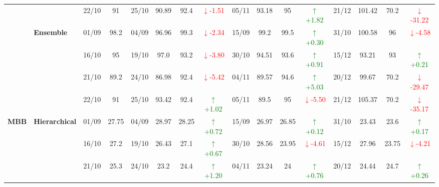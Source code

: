 \documentclass{ieeeaccess}
\begin{document}
{\begin{longtable}{llcc|cccc|cccc|cccc}
&
& 22/10 & 91 & 25/10 & 90.89 & 92.4 & \textcolor{red}{\(\downarrow\)-1.51} & 05/11 & 93.18 & 95 & \textcolor{green}{\(\uparrow\)+1.82} & 21/12 & 101.42 & 70.2 & \textcolor{red}{\(\downarrow\)-31.22} \\
\cmidrule(lr){2-16}


& \textbf{Ensemble}
& 01/09 & 98.2 & 04/09 & 96.96 & 99.3 & \textcolor{red}{\(\downarrow\)-2.34} & 15/09 & 99.2 & 99.5 & \textcolor{green}{\(\uparrow\)+0.30} & 31/10 & 100.58 & 96 & \textcolor{red}{\(\downarrow\)-4.58} \\

&
& 16/10 & 95 & 19/10 & 97.0 & 93.2 & \textcolor{red}{\(\downarrow\)-3.80} & 30/10 & 94.51 & 93.6 & \textcolor{green}{\(\uparrow\)+0.91} & 15/12 & 93.21 & 93 & \textcolor{green}{\(\uparrow\)+0.21} \\

&
& 21/10 & 89.2 & 24/10 & 86.98 & 92.4 & \textcolor{red}{\(\downarrow\)-5.42} & 04/11 & 89.57 & 94.6 & \textcolor{green}{\(\uparrow\)+5.03} & 20/12 & 99.67 & 70.2 & \textcolor{red}{\(\downarrow\)-29.47} \\

&
& 22/10 & 91 & 25/10 & 93.42 & 92.4 & \textcolor{green}{\(\uparrow\)+1.02} & 05/11 & 89.5 & 95 & \textcolor{red}{\(\downarrow\)-5.50} & 21/12 & 105.37 & 70.2 & \textcolor{red}{\(\downarrow\)-35.17} \\
\midrule



\multirow{12}{*}{\textbf{MBB}} 
& \textbf{Hierarchical}
& 01/09 & 27.75 & 04/09 & 28.97 & 28.25 & \textcolor{green}{\(\uparrow\)+0.72} & 15/09 & 26.97 & 26.85 & \textcolor{green}{\(\uparrow\)+0.12} & 31/10 & 23.43 & 23.6 & \textcolor{green}{\(\uparrow\)+0.17} \\

&
& 16/10 & 27.2 & 19/10 & 26.43 & 27.1 & \textcolor{green}{\(\uparrow\)+0.67} & 30/10 & 28.56 & 23.95 & \textcolor{red}{\(\downarrow\)-4.61} & 15/12 & 27.96 & 23.75 & \textcolor{red}{\(\downarrow\)-4.21} \\

&
& 21/10 & 25.3 & 24/10 & 23.2 & 24.4 & \textcolor{green}{\(\uparrow\)+1.20} & 04/11 & 23.24 & 24 & \textcolor{green}{\(\uparrow\)+0.76} & 20/12 & 24.44 & 24.7 & \textcolor{green}{\(\uparrow\)+0.26} \\


\end{longtable}}
\end{document}
